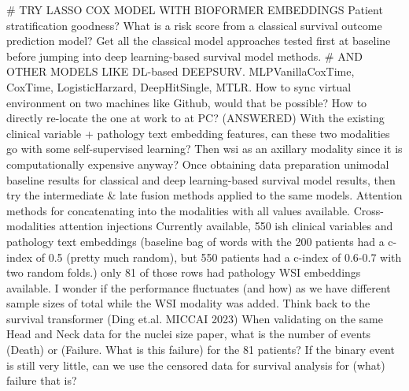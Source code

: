 \documentclass{article}%
\begin{document}
%
\# TRY LASSO COX MODEL WITH BIOFORMER EMBEDDINGS%
\newline%
\newline%
%
Patient stratification goodness? What is a risk score from a classical survival outcome prediction model? %
\newline%
\newline%
%
Get all the classical model approaches tested first at baseline before jumping into deep learning{-}based survival model methods.%
\newline%
\newline%
%
\# AND OTHER MODELS LIKE DL{-}based DEEPSURV. MLPVanillaCoxTime, CoxTime, LogisticHarzard, DeepHitSingle, MTLR. %
\newline%
\newline%
%
How to sync virtual environment on two machines like Github, would that be possible? How to directly re{-}locate the one at work to at PC? (ANSWERED)%
\newline%
\newline%
%
With the existing clinical variable + pathology text embedding features, can these two modalities go with some self{-}supervised learning? Then wsi as an axillary modality since it is computationally expensive anyway? %
\newline%
\newline%
%
Once obtaining data preparation unimodal baseline results for classical and deep learning{-}based survival model results, then try the intermediate \& late fusion methods applied to the same models. Attention methods for concatenating into the modalities with all values available.%
\newline%
\newline%
%
Cross{-}modalities attention injections %
\newline%
\newline%
%
Currently available, 550 ish clinical variables and pathology text embeddings (baseline bag of words with the 200 patients had a c{-}index of 0.5 (pretty much random), but 550 patients had a c{-}index of 0.6{-}0.7 with two random folds.) only 81 of those rows had pathology WSI embeddings available. I wonder if the performance fluctuates (and how) as we have different sample sizes of total while the WSI modality was added. Think back to the survival transformer (Ding et.al. MICCAI 2023) %
\newline%
\newline%
%
When validating on the same Head and Neck data for the nuclei size paper, what is the number of events (Death) or (Failure. What is this failure) for the 81 patients? If the binary event is still very little, can we use the censored data for survival analysis for (what) failure that is? %
\end{document}
